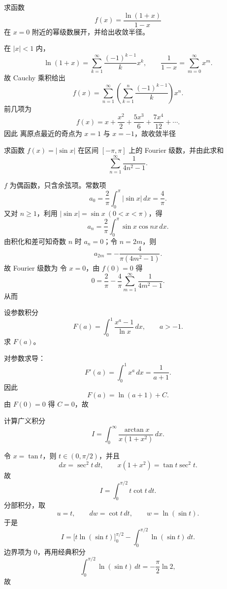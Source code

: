 \begin{question}
求函数
\[
f(x)=\frac{\ln(1+x)}{1-x}
\]
在 $x=0$ 附近的幂级数展开，并给出收敛半径。
\begin{solution}

在 $|x|<1$ 内，
\[
\ln(1+x)=\sum_{k=1}^{\infty}\frac{(-1)^{k-1}}{k}x^k,
\qquad
\frac{1}{1-x}=\sum_{m=0}^{\infty}x^m.
\]
故 Cauchy 乘积给出
\[
f(x)=\sum_{n=1}^{\infty}\left(\sum_{k=1}^{n}\frac{(-1)^{k-1}}{k}\right)x^n.
\]
前几项为
\[
f(x)=x+\frac{x^2}{2}+\frac{5x^3}{6}+\frac{7x^4}{12}+\cdots.
\]
因此
离原点最近的奇点为 $x=1$ 与 $x=-1$，故收敛半径
\end{solution}
\end{question}

\begin{question}
求函数 $f(x)=|\sin x|$ 在区间 $[-\pi,\pi]$ 上的 Fourier 级数，并由此求和
\[
\sum_{n=1}^{\infty}\frac{1}{4n^2-1}.
\]
\begin{solution}

$f$ 为偶函数，只含余弦项。常数项
\[
a_0=\frac{2}{\pi}\int_0^{\pi}|\sin x|\,dx=\frac{4}{\pi}.
\]
又对 $n\ge1$，利用 $|\sin x|=\sin x\ (0<x<\pi)$，得
\[
a_n=\frac{2}{\pi}\int_0^{\pi}\sin x\cos nx\,dx.
\]
由积化和差可知奇数 $n$ 时 $a_n=0$；令 $n=2m$，则
\[
a_{2m}=-\frac{4}{\pi(4m^2-1)}.
\]
故 Fourier 级数为
令 $x=0$，由 $f(0)=0$ 得
\[
0=\frac{2}{\pi}-\frac{4}{\pi}\sum_{m=1}^{\infty}\frac{1}{4m^2-1}.
\]
从而
\end{solution}
\end{question}

\begin{question}
设参数积分
\[
F(a)=\int_0^1 \frac{x^a-1}{\ln x}\,dx,
\qquad a>-1.
\]
求 $F(a)$。
\begin{solution}

对参数求导：
\[
F'(a)=\int_0^1 x^a\,dx=\frac{1}{a+1}.
\]
因此
\[
F(a)=\ln(a+1)+C.
\]
由 $F(0)=0$ 得 $C=0$，故
\end{solution}
\end{question}

\begin{question}
计算广义积分
\[
I=\int_0^{\infty}\frac{\arctan x}{x(1+x^2)}\,dx.
\]
\begin{solution}

令 $x=\tan t$，则 $t\in(0,\pi/2)$，并且
\[
dx=\sec^2 t\,dt,
\qquad x(1+x^2)=\tan t\sec^2 t.
\]
故
\[
I=\int_0^{\pi/2} t\cot t\,dt.
\]
分部积分，取
\[
u=t,
\qquad dw=\cot t\,dt,
\qquad w=\ln(\sin t).
\]
于是
\[
I=\bigl[t\ln(\sin t)\bigr]_0^{\pi/2}-\int_0^{\pi/2}\ln(\sin t)\,dt.
\]
边界项为 $0$，再用经典积分
\[
\int_0^{\pi/2}\ln(\sin t)\,dt=-\frac{\pi}{2}\ln 2,
\]
故
\end{solution}
\end{question}


